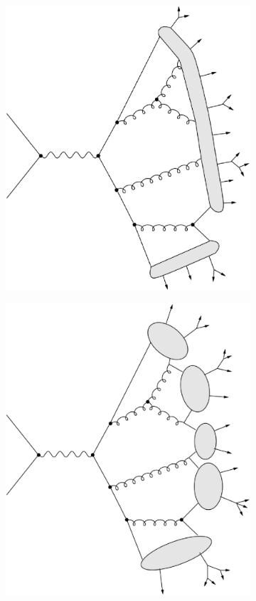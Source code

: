 \begin{figure}[!t]
\begin{center}
\begin{subfigure}{0.3\textwidth}
        \includegraphics[width=\textwidth]{MCsimulation/Figures/HadronizationString.eps}
        \caption{}\end{subfigure}
    \begin{subfigure}{0.3\textwidth}
        \includegraphics[width=\textwidth]{MCsimulation/Figures/HadronizationCluster.eps}

\end{subfigure}
\end{center}
\end{figure}
